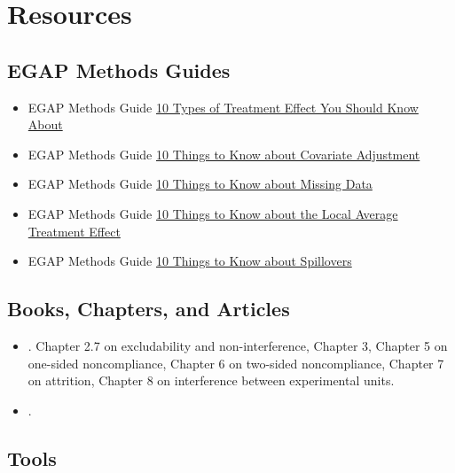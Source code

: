 \documentclass[12pt,]{book}
\begin{document}
\hypertarget{resources-4}{%
\section{Resources}\label{resources-4}}

\hypertarget{egap-methods-guides-4}{%
\subsection{EGAP Methods Guides}\label{egap-methods-guides-4}}

\begin{itemize}
\item
  EGAP Methods Guide \href{https://egap.org/resource/10-types-of-treatment-effect-you-should-know-about/}{10 Types of Treatment Effect You Should Know About}
\item
  EGAP Methods Guide \href{https://egap.org/resource/10-things-to-know-about-covariate-adjustment/}{10 Things to Know about Covariate Adjustment}
\item
  EGAP Methods Guide \href{https://egap.org/resource/10-things-to-know-about-missing-data/}{10 Things to Know about Missing Data}
\item
  EGAP Methods Guide \href{https://egap.org/resource/10-things-to-know-about-the-local-average-treatment-effect/}{10 Things to Know about the Local Average Treatment Effect}
\item
  EGAP Methods Guide \href{https://egap.org/resource/10-things-to-know-about-spillovers/}{10 Things to Know about Spillovers}
\end{itemize}

\hypertarget{books-chapters-and-articles-3}{%
\subsection{Books, Chapters, and Articles}\label{books-chapters-and-articles-3}}

\begin{itemize}
\item
  \autocite{gerber_field_2012}. Chapter 2.7 on excludability and non-interference, Chapter 3, Chapter 5 on one-sided noncompliance, Chapter 6 on two-sided noncompliance, Chapter 7 on attrition, Chapter 8 on interference between experimental units.
\item
  \autocite{bowers2020causality}.
\end{itemize}

\hypertarget{tools-2}{%
\subsection{Tools}\label{tools-2}}
\end{document}
